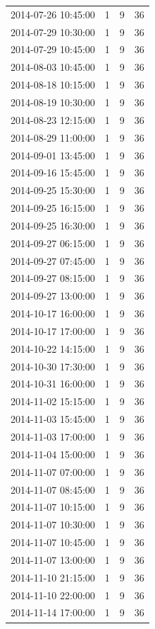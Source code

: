 \begin{tabular}{lrrr}
2014-07-26 10:45:00 & 1 & 9 & 36 \\
2014-07-29 10:30:00 & 1 & 9 & 36 \\
2014-07-29 10:45:00 & 1 & 9 & 36 \\
2014-08-03 10:45:00 & 1 & 9 & 36 \\
2014-08-18 10:15:00 & 1 & 9 & 36 \\
2014-08-19 10:30:00 & 1 & 9 & 36 \\
2014-08-23 12:15:00 & 1 & 9 & 36 \\
2014-08-29 11:00:00 & 1 & 9 & 36 \\
2014-09-01 13:45:00 & 1 & 9 & 36 \\
2014-09-16 15:45:00 & 1 & 9 & 36 \\
2014-09-25 15:30:00 & 1 & 9 & 36 \\
2014-09-25 16:15:00 & 1 & 9 & 36 \\
2014-09-25 16:30:00 & 1 & 9 & 36 \\
2014-09-27 06:15:00 & 1 & 9 & 36 \\
2014-09-27 07:45:00 & 1 & 9 & 36 \\
2014-09-27 08:15:00 & 1 & 9 & 36 \\
2014-09-27 13:00:00 & 1 & 9 & 36 \\
2014-10-17 16:00:00 & 1 & 9 & 36 \\
2014-10-17 17:00:00 & 1 & 9 & 36 \\
2014-10-22 14:15:00 & 1 & 9 & 36 \\
2014-10-30 17:30:00 & 1 & 9 & 36 \\
2014-10-31 16:00:00 & 1 & 9 & 36 \\
2014-11-02 15:15:00 & 1 & 9 & 36 \\
2014-11-03 15:45:00 & 1 & 9 & 36 \\
2014-11-03 17:00:00 & 1 & 9 & 36 \\
2014-11-04 15:00:00 & 1 & 9 & 36 \\
2014-11-07 07:00:00 & 1 & 9 & 36 \\
2014-11-07 08:45:00 & 1 & 9 & 36 \\
2014-11-07 10:15:00 & 1 & 9 & 36 \\
2014-11-07 10:30:00 & 1 & 9 & 36 \\
2014-11-07 10:45:00 & 1 & 9 & 36 \\
2014-11-07 13:00:00 & 1 & 9 & 36 \\
2014-11-10 21:15:00 & 1 & 9 & 36 \\
2014-11-10 22:00:00 & 1 & 9 & 36 \\
2014-11-14 17:00:00 & 1 & 9 & 36 \\

\end{tabular}

